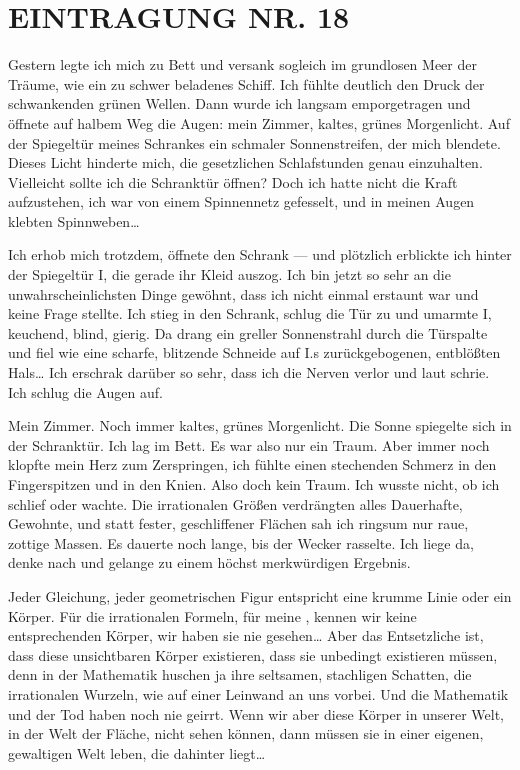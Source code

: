 \section{EINTRAGUNG NR. 18}

Gestern legte ich mich zu Bett und versank sogleich im grundlosen
Meer der Träume, wie ein zu schwer beladenes Schiff. Ich fühlte
deutlich den Druck der schwankenden grünen Wellen. Dann wurde ich
langsam emporgetragen und öffnete auf halbem Weg die Augen: mein
Zimmer, kaltes, grünes Morgenlicht. Auf der Spiegeltür meines
Schrankes ein schmaler Sonnenstreifen, der mich blendete. Dieses
Licht hinderte mich, die gesetzlichen Schlafstunden genau
einzuhalten. Vielleicht sollte ich die Schranktür öffnen? Doch ich
hatte nicht die Kraft aufzustehen, ich war von einem Spinnennetz
gefesselt, und in meinen Augen klebten Spinnweben\ldots{}

Ich erhob mich trotzdem, öffnete den Schrank — und plötzlich
erblickte ich hinter der Spiegeltür I, die gerade
ihr Kleid auszog. Ich bin jetzt so sehr an die unwahrscheinlichsten
Dinge gewöhnt, dass ich nicht einmal erstaunt war und keine Frage
stellte. Ich stieg in den Schrank, schlug die Tür zu und umarmte I,
keuchend, blind, gierig. Da drang ein greller Sonnenstrahl durch
die Türspalte und fiel wie eine scharfe, blitzende Schneide auf I.s
zurückgebogenen, entblößten Hals\ldots{} Ich erschrak darüber so sehr,
dass ich die Nerven verlor und laut schrie. Ich schlug die Augen
auf.

Mein Zimmer. Noch immer kaltes, grünes Morgenlicht. Die Sonne
spiegelte sich in der Schranktür. Ich lag im Bett. Es war also nur
ein Traum. Aber immer noch klopfte mein Herz zum Zerspringen, ich
fühlte einen stechenden Schmerz in den Fingerspitzen und in den
Knien. Also doch kein Traum. Ich wusste nicht, ob ich schlief oder
wachte. Die irrationalen Größen verdrängten alles Dauerhafte,
Gewohnte, und statt fester, geschliffener Flächen sah ich ringsum
nur raue, zottige Massen. Es dauerte noch lange, bis der Wecker
rasselte. Ich liege da, denke nach und gelange zu einem höchst
merkwürdigen Ergebnis.

Jeder Gleichung, jeder geometrischen Figur entspricht eine krumme
Linie oder ein Körper. Für die irrationalen Formeln, für meine \wurzel{},
kennen wir keine entsprechenden Körper, wir haben sie nie
gesehen\ldots{} Aber das Entsetzliche ist, dass diese unsichtbaren
Körper existieren, dass sie unbedingt existieren müssen, denn in
der Mathematik huschen ja ihre seltsamen, stachligen Schatten, die
irrationalen Wurzeln, wie auf einer Leinwand an uns vorbei. Und die
Mathematik und der Tod haben noch nie geirrt. Wenn wir aber diese
Körper in unserer Welt, in der Welt der Fläche, nicht sehen können,
dann müssen sie in einer eigenen, gewaltigen Welt leben, die
dahinter liegt\ldots{}

